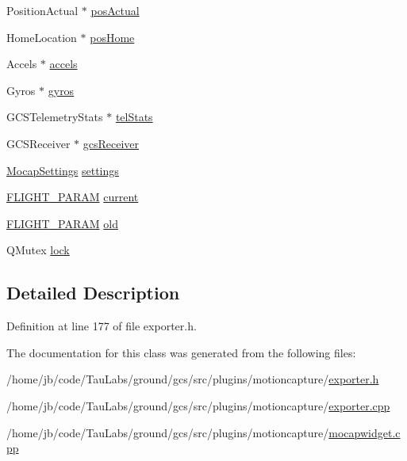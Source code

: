 \begin{DoxyCompactItemize}
\-Position\-Actual $\ast$ \hyperlink{group___mo_cap_plugin_ga48e371afeb39f31ab368d804798313f5}{pos\-Actual}
\item 
\-Home\-Location $\ast$ \hyperlink{group___mo_cap_plugin_ga9a7c0ada8bbd6bf8c95ca54f123befbe}{pos\-Home}
\item 
\-Accels $\ast$ \hyperlink{group___mo_cap_plugin_ga4dd5a6587431c70720881c0540f065c9}{accels}
\item 
\-Gyros $\ast$ \hyperlink{group___mo_cap_plugin_ga2b6042b4adabe6985d92cc22f33cfc9a}{gyros}
\item 
\-G\-C\-S\-Telemetry\-Stats $\ast$ \hyperlink{group___mo_cap_plugin_gad3a5a6122f88f8f4b44847053a7d830b}{tel\-Stats}
\item 
\-G\-C\-S\-Receiver $\ast$ \hyperlink{group___mo_cap_plugin_ga49b2f0b0762b95f0da3f7c4a7330b941}{gcs\-Receiver}
\item 
\hyperlink{group___mo_cap_plugin_ga6083347a5b3eb70e360f599354dc0f0b}{\-Mocap\-Settings} \hyperlink{group___mo_cap_plugin_ga50484fe9f9410948c133b1c589f73f76}{settings}
\item 
\hyperlink{group___h_i_t_l_plugin_ga7bda7a22b899fe8dff0ba9a0cae99da6}{\-F\-L\-I\-G\-H\-T\-\_\-\-P\-A\-R\-A\-M} \hyperlink{group___mo_cap_plugin_ga6c17ed61598da30f012113ffbff26816}{current}
\item 
\hyperlink{group___h_i_t_l_plugin_ga7bda7a22b899fe8dff0ba9a0cae99da6}{\-F\-L\-I\-G\-H\-T\-\_\-\-P\-A\-R\-A\-M} \hyperlink{group___mo_cap_plugin_ga5ef84da1bd9cf4e1d625c33beb5a148c}{old}
\item 
\-Q\-Mutex \hyperlink{group___mo_cap_plugin_ga55a5f9c6eb2d80cfc96523f4592f5417}{lock}
\end{DoxyCompactItemize}


\subsection{\-Detailed \-Description}


\-Definition at line 177 of file exporter.\-h.



\-The documentation for this class was generated from the following files\-:\begin{DoxyCompactItemize}
\item 
/home/jb/code/\-Tau\-Labs/ground/gcs/src/plugins/motioncapture/\hyperlink{exporter_8h}{exporter.\-h}\item 
/home/jb/code/\-Tau\-Labs/ground/gcs/src/plugins/motioncapture/\hyperlink{exporter_8cpp}{exporter.\-cpp}\item 
/home/jb/code/\-Tau\-Labs/ground/gcs/src/plugins/motioncapture/\hyperlink{mocapwidget_8cpp}{mocapwidget.\-cpp}\end{DoxyCompactItemize}
